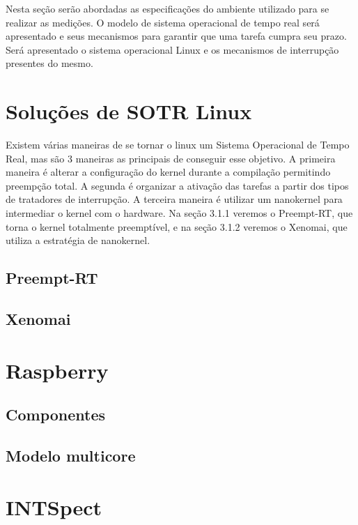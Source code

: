 
Nesta seção serão abordadas as especificações do ambiente utilizado para se realizar as medições. O modelo de sistema operacional de tempo real será apresentado e seus mecanismos para garantir que uma tarefa cumpra seu prazo. Será apresentado o sistema operacional Linux e os mecanismos de interrupção presentes do mesmo.

\section{Soluções de SOTR Linux}

Existem várias maneiras de se tornar o linux um Sistema Operacional de Tempo Real, mas são 3 maneiras as principais de conseguir esse objetivo. A primeira maneira é alterar a configuração do kernel durante a compilação permitindo preempção total. A segunda é organizar a ativação das tarefas a partir dos tipos de tratadores de interrupção. A terceira maneira é utilizar um nanokernel para intermediar o kernel com o hardware. Na seção 3.1.1 veremos o Preempt-RT, que torna o kernel totalmente preemptível, e na seção 3.1.2 veremos o Xenomai, que utiliza a estratégia de nanokernel.

\subsection{Preempt-RT}


\subsection{Xenomai}
\section{Raspberry}
\subsection{Componentes}
\subsection{Modelo multicore}
\section{INTSpect}

